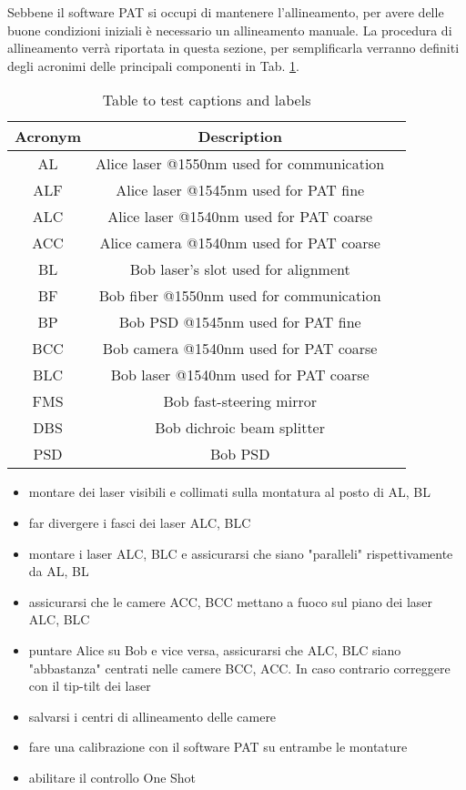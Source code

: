 Sebbene il software PAT si occupi di mantenere l'allineamento, per avere delle buone condizioni iniziali è necessario un allineamento manuale. La procedura di allineamento verrà riportata in questa sezione, per semplificarla verranno definiti degli acronimi delle principali componenti in Tab. \ref{table:1}.

\begin{table}[h!]
  \centering
  \begin{tabular}{ |c|c|c| }
    \hline
    Acronym & Description                                \\
    \hline
    AL      & Alice laser @1550nm used for communication \\
    ALF     & Alice laser @1545nm used for PAT fine      \\
    ALC     & Alice laser @1540nm used for PAT coarse    \\
    ACC     & Alice camera @1540nm used for PAT coarse   \\
    BL      & Bob laser's slot used for alignment        \\
    BF      & Bob fiber @1550nm used for communication   \\
    BP      & Bob PSD @1545nm used for PAT fine          \\
    BCC     & Bob camera @1540nm used for PAT coarse     \\
    BLC     & Bob laser @1540nm used for PAT coarse      \\
    FMS     & Bob fast-steering mirror                   \\
    DBS     & Bob dichroic beam splitter                 \\
    PSD     & Bob PSD                                    \\
    \hline
  \end{tabular}
  \caption{Table to test captions and labels}
  \label{table:1}
\end{table}

\begin{itemize}
  \item montare dei laser visibili e collimati sulla montatura al posto di AL, BL
  \item far divergere i fasci dei laser ALC, BLC
  \item montare i laser ALC, BLC e assicurarsi che siano "paralleli" rispettivamente da AL, BL
  \item assicurarsi che le camere ACC, BCC mettano a fuoco sul piano dei laser ALC, BLC
  \item puntare Alice su Bob e vice versa, assicurarsi che ALC, BLC siano "abbastanza" centrati nelle camere BCC, ACC. In caso contrario correggere con il tip-tilt dei laser
  \item salvarsi i centri di allineamento delle camere
  \item fare una calibrazione con il software PAT su entrambe le montature
  \item abilitare il controllo One Shot
\end{itemize}

